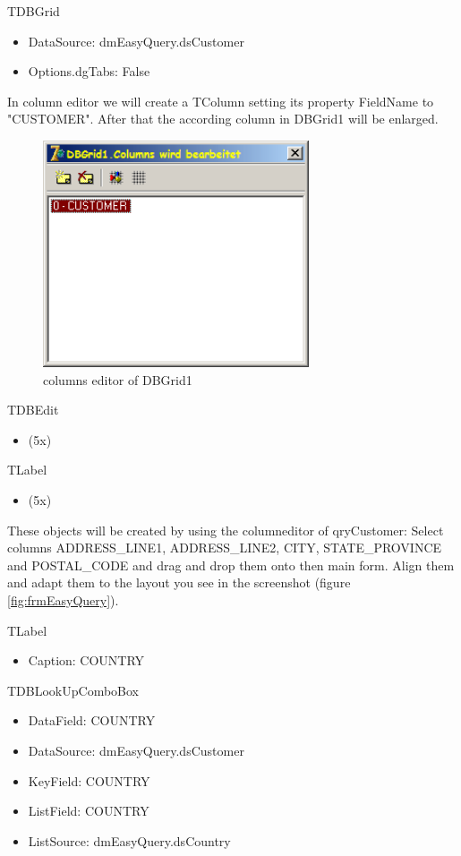 \documentclass[a4paper,12pt,oneside]{book}
\begin{document}
TDBGrid
\begin{itemize}
  \item DataSource: dmEasyQuery.dsCustomer
	\item Options.dgTabs: False
\end{itemize}

In column editor we will create a TColumn setting its property FieldName to "CUSTOMER".
After that the according column in DBGrid1 will be enlarged.

\begin{figure}[htbp] 
  \centering
  \includegraphics[width=0.7\textwidth]{ZeosTutorial/dbgrid1_columns.png}
  \caption{columns editor of DBGrid1}
  \label{fig:dbgrid1_columns}
\end{figure}

TDBEdit
\begin{itemize}
  \item (5x)
\end{itemize}

TLabel
\begin{itemize}
  \item (5x)
\end{itemize}

These objects will be created by using the columneditor of qryCustomer:
Select columns ADDRESS\_LINE1, ADDRESS\_LINE2, CITY, STATE\_PROVINCE and POSTAL\_CODE and drag and drop them onto then main form.
Align them and adapt them to the layout you see in the screenshot (figure \ref{fig:frmEasyQuery}).

TLabel
\begin{itemize}
  \item Caption: COUNTRY
\end{itemize}

TDBLookUpComboBox
\begin{itemize}
  \item DataField: COUNTRY
	\item DataSource: dmEasyQuery.dsCustomer
	\item KeyField: COUNTRY
	\item ListField: COUNTRY
	\item ListSource: dmEasyQuery.dsCountry
\end{itemize}
\end{document}
